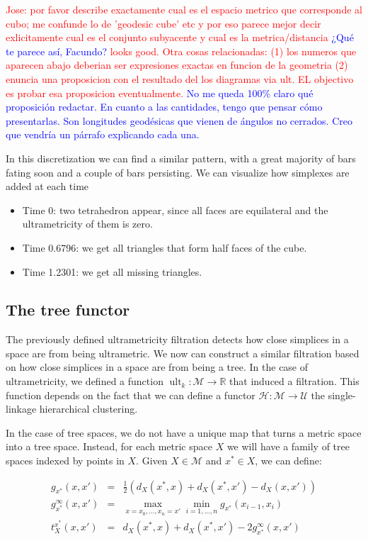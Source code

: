 \documentclass[a4paper,12pt,reqno, english]{amsart}
\DeclareMathOperator{\ult}{ult}
\newcommand{\R}{\mathbb{R}}
\newcommand{\M}{\mathcal{M}}
\renewcommand{\H}{\mathscr{H}}
\theoremstyle{plain}
\theoremstyle{definition}
\newcommand{\facundo}[1]{\textcolor{red}{#1}}
\newcommand{\jose}[1]{\textcolor{blue}{#1} }
\begin{document}
{{ \facundo{Jose: por favor describe exactamente cual es el espacio metrico que corresponde al cubo; me confunde lo de 'geodesic cube' etc y por eso parece mejor decir exlicitamente cual es el conjunto subyacente y cual es la metrica/distancia} \jose{ ¿Qué te parece así, Facundo?} \facundo{looks good. Otra cosas relacionadas: (1) los numeros que aparecen abajo deberian ser expresiones exactas en funcion de la geometria (2) enuncia una proposicion con el resultado del los diagramas via ult. EL objectivo es probar esa proposicion eventualmente.} \jose{No me queda 100\% claro qué proposición redactar. En cuanto a las cantidades, tengo que pensar cómo presentarlas. Son longitudes geodésicas que vienen de ángulos no cerrados. Creo que vendría un párrafo explicando cada una. }
 
 In this discretization we can find a similar pattern, with a great majority of bars fating soon and a couple of bars persisting. We can visualize how simplexes are added at each time
 
\begin{itemize}
\item Time 0: two tetrahedron appear, since all faces are equilateral and the ultrametricity of them is zero. 
\item Time 0.6796: we get all triangles that form half faces of the cube. 
\item Time 1.2301: we get all missing triangles.
\end{itemize}


\subsection{The tree functor}

The previously defined ultrametricity filtration detects how close simplices in a space are from being ultrametric. We now can construct a similar filtration based on how close simplices in a space are from being a tree. In the case of ultrametricity, we defined a function $\ult_k:\M\rightarrow \R$ that induced a filtration. This function depends on the fact that we can define a functor $\H:\M\rightarrow \mathcal{U}$ the single-linkage hierarchical clustering. 

In the case of tree spaces, we do not have a unique map that turns a metric space into a tree space. Instead, for each metric space $X$ we will have a family of tree spaces indexed by points in $X$. Given $X\in \M$ and $x^*\in X$, we can define:

\begin{eqnarray*}
	g_{x^*}(x,x')&=& \frac{1}{2}(d_X(x^*,x)+d_X(x^*,x')- d_X(x,x'))\\
    g^\infty_{x^*}(x,x')&= &\max_{x=x_0,...,x_n=x'}\min_{i=1,...,n} g_{x^*}(x_{i-1},x_{i})\\
    t^{x^*}_X(x,x')&=& d_X(x^*,x)+d_X(x^*,x')- 2g^\infty_{x^*}(x,x')
\end{eqnarray*}

}}
\end{document}
